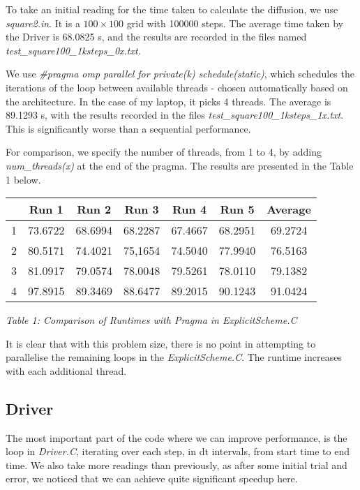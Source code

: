 \documentclass[11pt,journal]{IEEEtran}
\begin{document}
	To take an initial reading for the time taken to calculate the diffusion, we use \emph{square2.in}. It is a $100 \times 100$ grid with 100000 steps. The average time taken by the Driver is 68.0825 s, and the results are recorded in the files named \emph{test\_square100\_1ksteps\_0x.txt}.
	
	We use \emph{\#pragma omp parallel for private(k) schedule(static)}, which schedules the iterations of the loop between available threads - chosen automatically based on the architecture. In the case of my laptop, it picks 4 threads. The average is 89.1293 s, with the results recorded in the files \emph{test\_square100\_1ksteps\_1x.txt}. This is significantly worse than a sequential performance. 
	
	For comparison, we specify the number of threads, from 1 to 4, by adding \emph{num\_threads(x)} at the end of the pragma. The results are presented in the Table 1 below. 
	\begin{table}[h]
		\centering
	\begin{tabular}{|c||c|c|c|c|c||c|}
		\hline 
		 & Run 1  & Run 2  & Run 3  & Run 4  & Run 5  & Average  \\ 
		\hline 
		1 & 73.6722  & 68.6994  & 68.2287  & 67.4667  & 68.2951  & 69.2724  \\ 
		\hline 
		2 & 80.5171  & 74.4021  & 75,1654  & 74.5040  & 77.9940  & 76.5163  \\ 
		\hline 
		3& 81.0917  & 79.0574  & 78.0048  & 79.5261  & 78.0110  & 79.1382  \\ 
		\hline 
		4& 97.8915 & 89.3469 & 88.6477 & 89.2015 & 90.1243 & 91.0424 \\ 
		\hline 
	\end{tabular} 
\emph{Table 1: Comparison of Runtimes with Pragma in ExplicitScheme.C}
\end{table}
	
	It is clear that with this problem size, there is no point in attempting to parallelise the remaining loops in the \emph{ExplicitScheme.C}. The runtime increases with each additional thread. 
	
	\subsection{Driver}
	The most important part of the code where we can improve performance, is the loop in \emph{Driver.C}, iterating over each step, in dt intervals, from start time to end time. We also take more readings than previously, as after some initial trial and error, we noticed that we can achieve quite significant speedup here.
	
\end{document}
